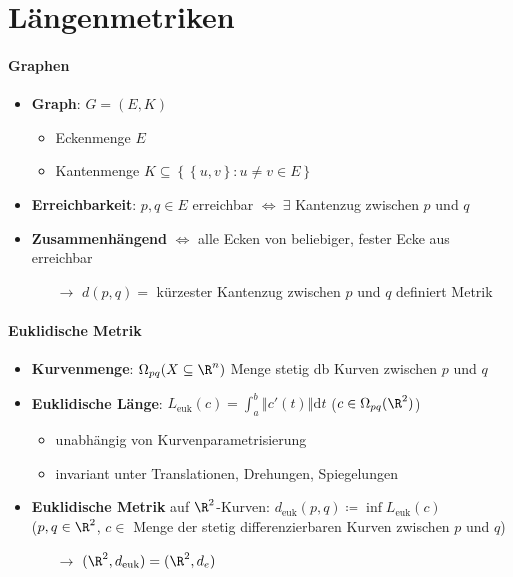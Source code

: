 \section{Längenmetriken}

\paragraph{Graphen}
\begin{itemize}
  \item \textbf{Graph}: \( G = (E,K) \) 
  \begin{itemize}
    \item Eckenmenge \( E \)
    \item Kantenmenge \( K \subseteq \left \{ \left \{ u,v \right \} : u \neq v \in E \right \} \)
  \end{itemize}
  \item \textbf{Erreichbarkeit}: \( p,q \in E \) erreichbar \( \Leftrightarrow \ \exists \) Kantenzug zwischen \( p \) und \( q \)
  \item \textbf{Zusammenhängend} \( \Leftrightarrow \) alle Ecken von beliebiger, fester Ecke aus erreichbar
  \begin{itemize}
    \item[\( \to \)] \( d(p,q) = \) kürzester Kantenzug zwischen \( p \) und \( q \) definiert Metrik
  \end{itemize}
\end{itemize}

\paragraph{Euklidische Metrik}
\begin{itemize}
  \item \textbf{Kurvenmenge}: \( \Omega_{pq}(X \subseteq \R^n) \) Menge stetig db Kurven zwischen \( p \) und \( q \)
  \item \textbf{Euklidische Länge}: \( L_{\text{euk}}(c) = \int_a^b \left\Vert c'(t) \right\Vert \text{d}t \) (\( c \in \Omega_{pq}(\R^2) \))
  \begin{itemize}
    \item unabhängig von Kurvenparametrisierung
    \item invariant unter Translationen, Drehungen, Spiegelungen
  \end{itemize}
  \item \textbf{Euklidische Metrik} auf \( \R^2 \)-Kurven: \( d_\text{euk}(p,q) \coloneqq \inf L_{\text{euk}}(c) \) \\
  (\( p,q \in \R^2 \), \( c \in \) Menge der stetig differenzierbaren Kurven zwischen \( p \) und \( q \))
  \begin{itemize}
    \item[\( \to \)] \( (\R^2, d_{\text{euk}}) = (\R^2, d_e) \)
  \end{itemize}
\end{itemize}

